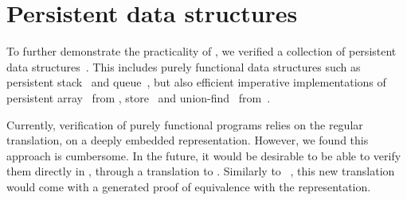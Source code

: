 \section{Persistent data structures}
\label{sec:persistent}

To further demonstrate the practicality of \Zoo, we verified a collection of persistent data structures~.
This includes purely functional data structures such as persistent stack~ and queue~, but also efficient imperative implementations of persistent array~ from \citet{DBLP:conf/ml/ConchonF07}, store~ and union-find~ from~\citet{DBLP:journals/pacmpl/AllainC0S24}.

Currently, verification of purely functional programs relies on the regular \ZooLang translation, \ie on a deeply embedded representation.
However, we found this approach is cumbersome.
In the future, it would be desirable to be able to verify them directly in \Rocq, through a translation to \Gallina.
Similarly to \Hacspec~\citep{DBLP:conf/cpp/HaselwarterHHWH24}, this new translation would come with a generated proof of equivalence with the \ZooLang representation.

